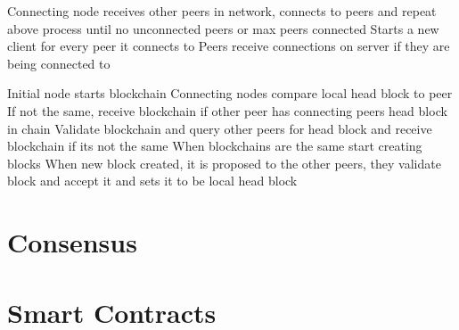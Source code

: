 Connecting node receives other peers in network, connects to peers and repeat above process until no unconnected peers or max peers connected
Starts a new client for every peer it connects to
Peers receive connections on server if they are being connected to

Initial node starts blockchain
Connecting nodes compare local head block to peer
If not the same, receive blockchain if other peer has connecting peers head block in chain
Validate blockchain and query other peers for head block and receive blockchain if its not the same
When blockchains are the same start creating blocks
When new block created, it is proposed to the other peers, they validate block and accept it and sets it to be local head block 


\section{Consensus}

\section{Smart Contracts}